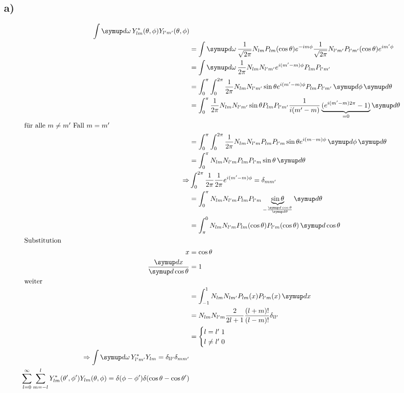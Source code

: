     \subsection{a)}
    \begin{align}
    \int \dif{\omega} Y_{lm}^* (\theta, \phi) Y_{l'm'}(\theta , \phi)\\
    &=\int \dif{\omega} \frac{1}{\sqrt{2 \pi}} N_{lm} P_{lm} (\cos \theta) e^{-im\phi} 
    \frac{1}{\sqrt{2 \pi}} N_{l'm'} P_{l'm'}(\cos \theta) e^{im' \phi}\\
    &=\int \dif{\omega} \frac{1}{2 \pi} N_{lm} N_{l'm'} e^{i(m'-m)\phi} P_{lm} P_{l'm'}\\
    &=\int_0^{\pi} \int_0^{2 \pi} \frac{1}{2 \pi} N_{lm} N_{l'm'} \sin \theta e^{i(m'-m)\phi} P_{lm} P_{l'm'}
    \dif{\phi} \dif{\theta}\\
    &=\int_0^{\pi} \frac{1}{2\pi} N_{lm} N_{l'm'} \sin \theta P_{lm} P_{l'm'} \frac{1}{i(m'-m)} 
    \underbrace{(e^{i(m'-m)2 \pi}-1 )}_{=0} \dif{\theta} \\
    \intertext{
        für alle $m \ne m'$ 
        Fall $m=m'$
    }
    &=\int_0^{\pi} \int_0^{2 \pi} \frac{1}{2 \pi} N_{lm} N_{l'm} P_{lm} P_{l'm} \sin \theta e^{i(m-m)\phi} \dif{\phi} \dif{\theta}\\
    &= \int_0^{\pi} N_{lm} N_{l'm} P_{lm} P_{l'm} \sin \theta \dif{\theta} \\
    \Rightarrow &\int_0^{2\pi} \frac{1}{2 \pi} \frac{1}{2\pi} e^{i(m'-m)\phi} = \delta _{mm'}\\
    &=\int_0^{\pi} N_{lm} N_{l'm} P_{lm} P_{l'm} \underbrace{\sin \theta}_{-\frac{\dif{\cos \theta}}{\dif{\theta}}} \dif{\theta}\\
    &= \int_{\pi}^0 N_{lm} N_{l'm} P_{lm}(\cos \theta) P_{l'm} (\cos \theta) \dif{\cos \theta}\\
    \intertext{
        Substitution 
    }    
    x&= \cos \theta\\
    \frac{\dif{x}}{\dif{\cos \theta}} &=1\\
    \intertext{
        weiter
    }
    &= \int _{-1}^1 N_{lm} N_{lm'} P_{lm}(x) P_{l'm}(x) \dif{x}\\
    &= N_{lm} N_{l'm} \frac{2}{2l+1} \frac{(l+m)!}{(l-m)!} \delta _{ll'} \\
    &=\begin{cases}
    l=l' \;1\\
    l \ne l' \;0
    \end{cases}\\
    \Rightarrow \int \dif{\omega} Y_{l'm'}^* Y_{lm} = \delta_{ll'} \delta _{mm'}\\
    \sum_{l=0}^{\infty} \sum_{m=-l}^l Y_{lm}^* (\theta ' , \phi ') Y_{lm} (\theta , \phi) = \delta (\phi - \phi ') \delta (\cos \theta - \cos \theta ')\\
    \end{align}

